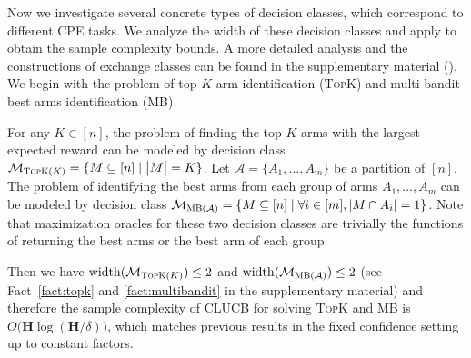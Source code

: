 \documentclass{article}
\newcommand{\wei}[1]{}
\newcommand{\wei}[1]{{\color{blue!50!black}  [\text{Wei:} #1]}}
\newcommand{\Algorithm}{{\small \textsf{CLUCB}}\xspace}
\newcommand{\Problem}{{CPE}\xspace}
\newcommand{\M}{\mathcal M}
\DeclareMathOperator{\rank}{width}
\newcommand{\MultiIdent}{\textsc{TopK}\xspace}
\newcommand{\MultiBandit}{\textsc{MB}\xspace}
\begin{document}
Now we investigate several concrete types of decision classes, which correspond to different \Problem tasks.
We analyze the width of these decision classes and apply  to obtain the sample complexity bounds.
A more detailed analysis and the constructions of exchange classes can be found in the supplementary material ().
We begin with the problem of top-$K$ arm identification (\MultiIdent) and multi-bandit best arms identification (\MultiBandit).
\begin{example}[\MultiIdent and \MultiBandit]
\label{example:topk}
For any $K\in[n]$, the problem of finding the top $K$ arms with the largest expected reward can be modeled by decision class $\M_{\MultiIdent(K)}=\{M\subseteq [n] \mid \big|M\big| = K\}$.
Let $\mathcal A=\{A_1,\ldots,A_m\}$ be a partition of $[n]$. 
The problem of identifying the best arms from each group of arms $A_1,\ldots,A_m$ can be modeled by decision class
$\M_{\MultiBandit(\mathcal A)} = \{M \subseteq [n] \mid \forall i\in [m], |M\cap A_i| = 1\}$.
Note that maximization oracles for these two decision classes are trivially the functions of returning the best arms or the best arm of each group.

Then we have $\rank(\M_{\MultiIdent(K)}) \le 2$ and $\rank(\M_{\MultiBandit(\mathcal A)}) \le 2$
(see Fact~\ref{fact:topk} and \ref{fact:multibandit} in the supplementary material) and therefore the sample complexity of \Algorithm for solving \MultiIdent and \MultiBandit is $O\big(\mathbf H \log(\mathbf H/\delta)\big)$,  which matches previous results in the fixed confidence setting \citep{kalyanakrishnan2012pac,gabillon2012best,kaufmann2013information} up to constant factors.
\end{example}
\end{document}
